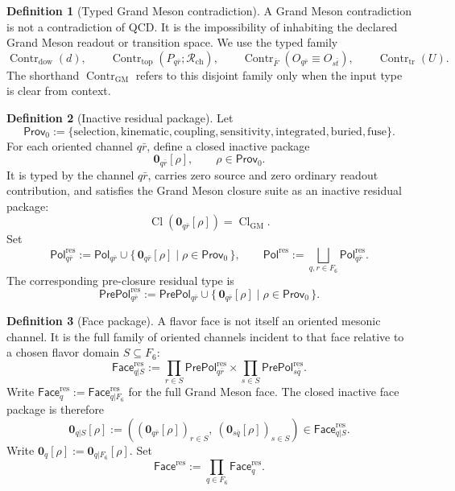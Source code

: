\documentclass[11pt]{article}
\theoremstyle{definition}
\newtheorem{definition}{Definition}
\theoremstyle{plain}
\DeclareMathOperator{\Cl}{Cl}
\DeclareMathOperator{\Contr}{Contr}
\begin{document}
\begin{definition}[Typed Grand Meson contradiction]
A Grand Meson contradiction is not a contradiction of QCD.  It is the
impossibility of inhabiting the declared Grand Meson readout or transition
space.  We use the typed family
\[
  \Contr_{\mathrm{dow}}(d),\qquad
  \Contr_{\mathrm{top}}(P_{q\bar r};\mathcal R_{\mathrm{ch}}),\qquad
  \Contr_{\bar F}(O_{q\bar r}\equiv O_{s\bar t}),\qquad
  \Contr_{\mathrm{tr}}(U).
\]
The shorthand \(\Contr_{\mathrm{GM}}\) refers to this disjoint family only
when the input type is clear from context.
\end{definition}

\begin{definition}[Inactive residual package]
Let
\[
  \mathsf{Prov}_{0}
  :=
  \{\mathrm{selection},\mathrm{kinematic},\mathrm{coupling},
    \mathrm{sensitivity},\mathrm{integrated},\mathrm{buried},
    \mathrm{fuse}\}.
\]
For each oriented channel \(q\bar r\), define a closed inactive package
\[
  \mathbf 0_{q\bar r}[\rho],
  \qquad
  \rho\in\mathsf{Prov}_{0}.
\]
It is typed by the channel \(q\bar r\), carries zero source and zero
ordinary readout contribution, and satisfies the Grand Meson closure suite
as an inactive residual package:
\[
  \Cl(\mathbf 0_{q\bar r}[\rho])=\Cl_{\mathrm{GM}}.
\]
Set
\[
  \mathsf{Pol}^{\mathrm{res}}_{q\bar r}
  :=
  \mathsf{Pol}_{q\bar r}\cup
  \{\,\mathbf 0_{q\bar r}[\rho]
  \mid
  \rho\in\mathsf{Prov}_{0}\,\},
  \qquad
  \mathsf{Pol}^{\mathrm{res}}
  :=
  \bigsqcup_{q,r\in F_6}\mathsf{Pol}^{\mathrm{res}}_{q\bar r}.
\]
The corresponding pre-closure residual type is
\[
  \mathsf{PrePol}^{\mathrm{res}}_{q\bar r}
  :=
  \mathsf{PrePol}_{q\bar r}\cup
  \{\,\mathbf 0_{q\bar r}[\rho]
  \mid
  \rho\in\mathsf{Prov}_{0}\,\}.
\]
\end{definition}

\begin{definition}[Face package]
A flavor face is not itself an oriented mesonic channel.  It is the full
family of oriented channels incident to that face relative to a chosen
flavor domain \(S\subseteq F_6\):
\[
  \mathsf{Face}^{\mathrm{res}}_{q|S}
  :=
  \prod_{r\in S}\mathsf{PrePol}^{\mathrm{res}}_{q\bar r}
  \times
  \prod_{s\in S}\mathsf{PrePol}^{\mathrm{res}}_{s\bar q}.
\]
Write \(\mathsf{Face}^{\mathrm{res}}_{q}:=
\mathsf{Face}^{\mathrm{res}}_{q|F_6}\) for the full Grand Meson face.
The closed inactive face package is therefore
\[
  \mathbf 0_{q|S}[\rho]
  :=
  \left(
    (\mathbf 0_{q\bar r}[\rho])_{r\in S},\
    (\mathbf 0_{s\bar q}[\rho])_{s\in S}
  \right)
  \in \mathsf{Face}^{\mathrm{res}}_{q|S}.
\]
Write \(\mathbf 0_q[\rho]:=\mathbf 0_{q|F_6}[\rho]\).
Set
\[
  \mathsf{Face}^{\mathrm{res}}
  :=
  \prod_{q\in F_6}\mathsf{Face}^{\mathrm{res}}_q .
\]
\end{definition}
\end{document}
